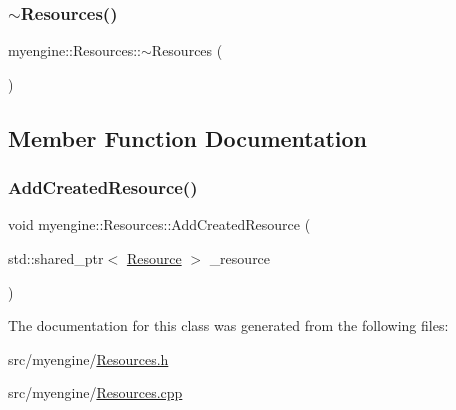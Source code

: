 \subsubsection{\texorpdfstring{$\sim$\+Resources()}{~Resources()}}
{\footnotesize\ttfamily myengine\+::\+Resources\+::$\sim$\+Resources (\begin{DoxyParamCaption}{ }\end{DoxyParamCaption})}



\subsection{Member Function Documentation}
\mbox{\label{classmyengine_1_1_resources_aec0d326b9f0e38e6f1aab9c6ecbaf733}} 
\subsubsection{\texorpdfstring{Add\+Created\+Resource()}{AddCreatedResource()}}
{\footnotesize\ttfamily void myengine\+::\+Resources\+::\+Add\+Created\+Resource (\begin{DoxyParamCaption}\item[{std\+::shared\+\_\+ptr$<$ \hyperlink{classmyengine_1_1_resource}{Resource} $>$}]{\+\_\+resource }\end{DoxyParamCaption})}



The documentation for this class was generated from the following files\+:\begin{DoxyCompactItemize}
\item 
src/myengine/\hyperlink{_resources_8h}{Resources.\+h}\item 
src/myengine/\hyperlink{_resources_8cpp}{Resources.\+cpp}\end{DoxyCompactItemize}
